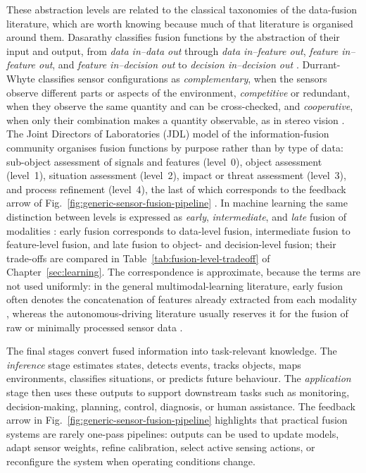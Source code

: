 These abstraction levels are related to the classical taxonomies of the data-fusion literature, which are worth knowing because much of that literature is organised around them. Dasarathy classifies fusion functions by the abstraction of their input and output, from \emph{data in--data out} through \emph{data in--feature out}, \emph{feature in--feature out}, and \emph{feature in--decision out} to \emph{decision in--decision out} \cite{dasarathy1997_fusion}. Durrant-Whyte classifies sensor configurations as \emph{complementary}, when the sensors observe different parts or aspects of the environment, \emph{competitive} or redundant, when they observe the same quantity and can be cross-checked, and \emph{cooperative}, when only their combination makes a quantity observable, as in stereo vision \cite{durrantwhyte1988_sensor}. The Joint Directors of Laboratories (JDL) model of the information-fusion community organises fusion functions by purpose rather than by type of data: sub-object assessment of signals and features (level~0), object assessment (level~1), situation assessment (level~2), impact or threat assessment (level~3), and process refinement (level~4), the last of which corresponds to the feedback arrow of Fig.~\ref{fig:generic-sensor-fusion-pipeline} \cite{steinberg1999_jdl}. In machine learning the same distinction between levels is expressed as \emph{early}, \emph{intermediate}, and \emph{late} fusion of modalities \cite{baltrusaitis_multimodal_2019}: early fusion corresponds to data-level fusion, intermediate fusion to feature-level fusion, and late fusion to object- and decision-level fusion; their trade-offs are compared in Table~\ref{tab:fusion-level-tradeoff} of Chapter~\ref{sec:learning}. The correspondence is approximate, because the terms are not used uniformly: in the general multimodal-learning literature, early fusion often denotes the concatenation of features already extracted from each modality \cite{baltrusaitis_multimodal_2019}, whereas the autonomous-driving literature usually reserves it for the fusion of raw or minimally processed sensor data \cite{feng2021_multimodal_survey}.


The final stages convert fused information into task-relevant knowledge. The \emph{inference} stage estimates states, detects events, tracks objects, maps environments, classifies situations, or predicts future behaviour. The \emph{application} stage then uses these outputs to support downstream tasks such as monitoring, decision-making, planning, control, diagnosis, or human assistance. The feedback arrow in Fig.~\ref{fig:generic-sensor-fusion-pipeline} highlights that practical fusion systems are rarely one-pass pipelines: outputs can be used to update models, adapt sensor weights, refine calibration, select active sensing actions, or reconfigure the system when operating conditions change.

